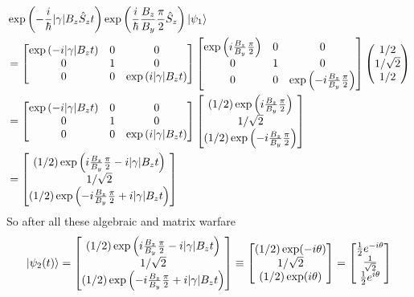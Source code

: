 \documentclass[letter, 10pts]{article}
\newcommand{\hb}{\hbar}
\begin{document}
\begin{align*}
& \exp
\left( 
- \frac{i}{\hb} |\gamma| B_z \hat{S}_z t  \right) \exp \left(
 \frac{i}{\hb} \frac{B_z}{B_y} \frac{\pi }{2} \hat{S}_z 
\right) \ket{\psi_1}  \\ 
&= 
\begin{bmatrix} 
\exp 
\left(  -i |\gamma| B_z  t\right )
&0&0\\
0&1&0\\
0&0& 
\exp 
\left(i |\gamma| B_z t  \right)  \end{bmatrix} 
\begin{bmatrix} 
\exp 
\left(  i \frac{B_z}{B_y} \frac{\pi}{2} \right )
&0&0\\
0&1&0\\
0&0& 
\exp 
\left( - i \frac{B_z}{B_y} \frac{\pi}{2} \right )
 \end{bmatrix} 
\begin{pmatrix} 
	1 / 2 \\
	1 / \sqrt{2}  \\ 
	1 / 2 
\end{pmatrix}\\  
&= 
\begin{bmatrix} 
\exp 
\left(  -i |\gamma| B_z  t\right )
&0&0\\
0&1&0\\
0&0& 
\exp 
\left(i |\gamma| B_z t  \right)  \end{bmatrix} 
\begin{bmatrix} 
	(1 / 2 )\exp 
\left(  i \frac{B_z}{B_y} \frac{\pi}{2} \right )
\\
1 / \sqrt{2} \\
(1 / 2 )\exp 
\left( - i \frac{B_z}{B_y} \frac{\pi}{2} \right )
 \end{bmatrix}\\ 
 &= 
\begin{bmatrix} 
	(1 / 2 )\exp 
\left(  i \frac{B_z}{B_y} \frac{\pi}{2} - i | \gamma | B_z t \right )
\\
1 / \sqrt{2} \\
(1 / 2 )\exp 
\left( - i \frac{B_z}{B_y} \frac{\pi}{2} + i | \gamma | B_z t\right )
 \end{bmatrix}\\ 
\end{align*}
So after all these algebraic and matrix warfare 
\[
\ket{\psi_2(t)} = 
\begin{bmatrix} 
	(1 / 2 )\exp 
\left(  i \frac{B_z}{B_y} \frac{\pi}{2} - i | \gamma | B_z t \right )
\\
1 / \sqrt{2} \\
(1 / 2 )\exp 
\left( - i \frac{B_z}{B_y} \frac{\pi}{2} + i | \gamma | B_z t\right )
 \end{bmatrix} \equiv 
 \begin{bmatrix} (1 / 2) \exp( - i \theta) \\ 1 / \sqrt{2}  \\ (1 / 2) \exp( i \theta) \end{bmatrix} = 
 \begin{bmatrix} \frac{1}{2} e^{- i \theta} \\ \frac{1}{\sqrt{2} } \\ \frac{1}{2}e^{i \theta} \end{bmatrix} 
\] 
\end{document}
